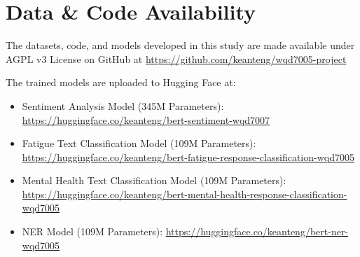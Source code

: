 \section{Data \& Code Availability}
The datasets, code, and models developed in this study are made available under AGPL v3 License on GitHub at \url{https://github.com/keanteng/wqd7005-project}

The trained models are uploaded to Hugging Face at:

\begin{itemize}
    \item Sentiment Analysis Model (345M Parameters): 
        \subitem \url{https://huggingface.co/keanteng/bert-sentiment-wqd7007}
    \item Fatigue Text Classification Model (109M Parameters): 
        \subitem \url{https://huggingface.co/keanteng/bert-fatigue-response-classification-wqd7005}
    \item Mental Health Text Classification Model (109M Parameters): 
        \subitem \url{https://huggingface.co/keanteng/bert-mental-health-response-classification-wqd7005}
    \item NER Model (109M Parameters): 
        \subitem \url{https://huggingface.co/keanteng/bert-ner-wqd7005}
\end{itemize}